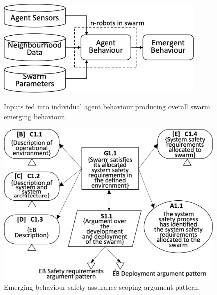 \documentclass[runningheads]{llncs}
\begin{document}
\begin{figure}[!t]
	\centering
	\begin{minipage}[b]{.5\textwidth}
		\centering
		\includegraphics[width=0.9\textwidth]{figures/stage1-systema-v2.png}
		\caption{Inputs fed into individual agent behaviour producing overall swarm emerging behaviour. }%
		\label{system-description}
      \end{minipage}%
      \hspace*{0.03\textwidth}
	\begin{minipage}[b]{.45\textwidth}
		\centering
		\includegraphics[width=0.99\textwidth]{figures/stage1-argumentpattern-v3.png}
		\vspace{-5ex}
		\caption{Emerging behaviour safety assurance scoping argument pattern.}
		\label{stage1-ap}
	\end{minipage}	
	\vspace{-4ex}
\end{figure}
\end{document}
